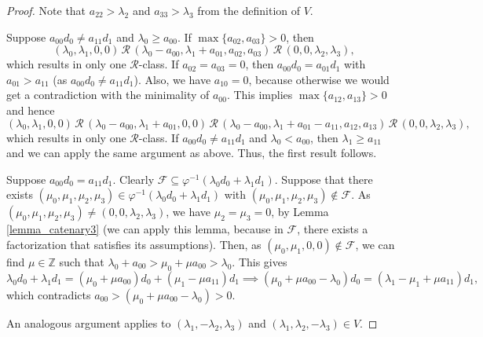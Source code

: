 \documentclass[12pt]{article}
\theoremstyle{remark}
\begin{document}
\begin{proof}
    Note that $a_{22} > \lambda_2$ and $a_{33} > \lambda_3$ from the definition of $V$.
    
    Suppose $a_{00}d_0 \neq a_{11}d_1$ and $\lambda_0 \geq a_{00}$. If $\max \{a_{02},a_{03}\} > 0$, then
    \begin{equation}
        (\lambda_0,\lambda_1,0,0) \, \mathcal{R} \, (\lambda_0 - a_{00},\lambda_1 + a_{01},a_{02},a_{03}) \, \mathcal{R} \, (0,0,\lambda_2,\lambda_3),
    \end{equation}
    which results in only one $\mathcal{R}$-class. If $a_{02}=a_{03}=0$, then $a_{00}d_0 = a_{01}d_1$ with $a_{01} > a_{11}$ (as $a_{00}d_0 \neq a_{11}d_1$). Also, we have $a_{10} = 0$, because otherwise we would get a contradiction with the minimality of $a_{00}$. This implies  $\max \{a_{12},a_{13}\} > 0$ and hence 
    \begin{equation}
        (\lambda_0,\lambda_1,0,0) \, \mathcal{R} \, (\lambda_0 - a_{00},\lambda_1 + a_{01},0,0) \, \mathcal{R} \, (\lambda_0 - a_{00},\lambda_1 + a_{01}-a_{11},a_{12},a_{13}) \, \mathcal{R} \, (0,0,\lambda_2,\lambda_3),
    \end{equation}
    which results in only one $\mathcal{R}$-class. If $a_{00}d_0 \neq a_{11}d_1$ and $\lambda_0 < a_{00}$, then $\lambda_1 \geq a_{11}$ and we can apply the same argument as above. Thus, the first result follows.

    Suppose $a_{00}d_0 = a_{11}d_1$. Clearly $\mathcal{F} \subseteq \varphi^{-1}(\lambda_0d_0 + \lambda_1d_1)$. Suppose that there exists $(\mu_0,\mu_1,\mu_2,\mu_3) \in \varphi^{-1}(\lambda_0d_0 + \lambda_1d_1)$ with $(\mu_0,\mu_1,\mu_2,\mu_3) \notin \mathcal{F}$. As $(\mu_0,\mu_1,\mu_2,\mu_3) \neq (0,0,\lambda_2,\lambda_3)$, we have $\mu_2=\mu_3 = 0$, by Lemma \ref{lemma_catenary3} (we can apply this lemma, because in $\mathcal{F}$, there exists a factorization that satisfies its assumptions). Then, as $(\mu_0,\mu_1,0,0) \notin \mathcal{F}$, we can find $\mu \in \mathbb{Z}$ such that $\lambda_0 + a_{00} > \mu_0 + \mu a_{00} > \lambda_0$. This gives
    \begin{equation}
        \lambda_0d_0 + \lambda_1d_1 = (\mu_0 + \mu a_{00})d_0 + (\mu_1 - \mu a_{11})d_1 \implies (\mu_0 + \mu a_{00} - \lambda_0)d_0 = (\lambda_1 - \mu_1 + \mu a_{11})d_1,  
    \end{equation}
    which contradicts $ a_{00} > (\mu_0 + \mu a_{00} - \lambda_0) > 0$.

    An analogous argument applies to $(\lambda_1,-\lambda_2,\lambda_3)$ and $(\lambda_1,\lambda_2,-\lambda_3) \in V$.
\end{proof}
\end{document}

